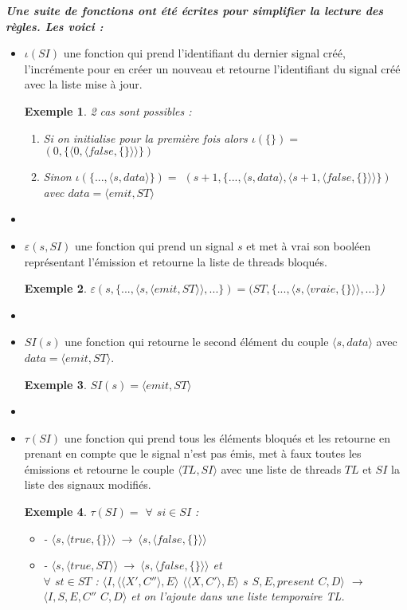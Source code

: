 \documentclass[10pt,a4paper]{report}
\newtheorem{ex}{Exemple}
\begin{document}
	
	\textbf{\textit{Une suite de fonctions ont été écrites pour simplifier la lecture des règles. Les voici :}}
	\smallbreak
	\begin{itemize}
		\item[] $\iota(SI)$ une fonction qui prend l'identifiant du dernier signal créé, l'incrémente pour en créer un nouveau et retourne l'identifiant du signal créé avec la liste mise à jour.
		\begin{ex}
			2 cas sont possibles :
			\begin{enumerate}
				\item[] Si on initialise pour la première fois alors  $\iota(\{\}) =$ $(0 ,\{\langle 0,\langle false,\{\}\rangle\rangle\})$
				\item[] Sinon $\iota(\{...,\langle s,data\rangle\}) =$ $(s+1 ,\{...,\langle s,data\rangle,\langle s+1,\langle false,\{\}\rangle\rangle\})$ avec $data = \langle emit,ST\rangle$
			\end{enumerate}
		\end{ex}
		
		\item[] 
		
		\item[] $\varepsilon(s,SI)$ une fonction qui prend un signal $s$ et met à vrai son booléen représentant l'émission et retourne la liste de threads bloqués.
		\begin{ex}
			$\varepsilon(s,\{...,\langle s,\langle emit,ST\rangle\rangle,...\}) = (ST,\{...,\langle s,\langle vraie,\{\}\rangle\rangle,...\}$)
		\end{ex}
		\item[]\newpage 
		
		\item[] $SI(s)$ une fonction qui retourne le second élément du couple $\langle s,data\rangle$ avec $data = \langle emit,ST\rangle$.
		\begin{ex}
			$SI(s) = \langle emit,ST\rangle$
		\end{ex}
		\item[]  
		
		\item[] $\tau(SI)$ une fonction qui prend tous les éléments bloqués et les retourne en prenant en compte que le signal n'est pas émis, met à faux toutes les émissions et retourne le couple $\langle TL,SI \rangle$ avec une liste de threads $TL$ et $SI$ la liste des signaux modifiés. 
		\begin{ex}
			$\tau(SI) =$ $\forall$ $si \in SI$ : 
			\begin{itemize}
				\item[] - $\langle s,\langle true,\{\}\rangle\rangle~\rightarrow~\langle s,\langle false,\{\}\rangle\rangle$
				\item[] - $\langle s,\langle true,ST\rangle\rangle~\rightarrow~\langle s,\langle false,\{\}\rangle\rangle$ et 
				\\$\forall$ $st \in ST$ : $\langle I,\langle\langle X',C''\rangle, E\rangle$ $\langle\langle X,C'\rangle, E\rangle$ $s$ $S,E,present$ $C,D\rangle$ $\rightarrow$ $ \langle I,S,E,C''$ $C,D\rangle$ et on l'ajoute dans une liste temporaire TL.
			\end{itemize}
		\end{ex}
	\end{itemize}
\end{document}
